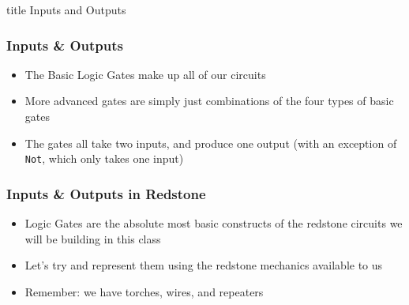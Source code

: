 \documentclass{beamer}
\begin{document}
            \begin{frame}
                \vfill
                \centering
                \begin{beamercolorbox}[sep=8pt,center,shadow=true,rounded=true]{title}
                    Inputs and Outputs\par%
                \end{beamercolorbox}
                \vfill
             \end{frame}
        
        
            \begin{frame}
                \frametitle{Inputs \& Outputs}
                \begin{itemize}
                    \item The Basic Logic Gates make up all of our circuits
                    \item More advanced gates are simply just combinations of the four types of basic gates
                    \item The gates all take two inputs, and produce one output (with an exception of \texttt{Not}, which only takes one input)
                \end{itemize}
            \end{frame}
            
            \begin{frame}
                \frametitle{Inputs \& Outputs in Redstone}
                \begin{itemize}
                    \item Logic Gates are the absolute most basic constructs of the redstone circuits we will be building in this class
                    \item Let's try and represent them using the redstone mechanics available to us
                    \item Remember: we have torches, wires, and repeaters
                \end{itemize}
            \end{frame}
            
\end{document}

